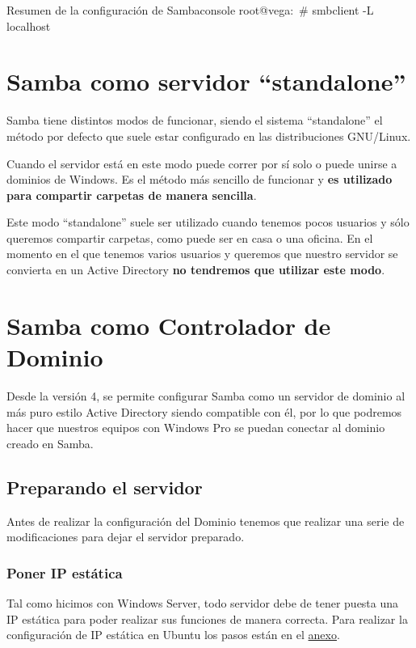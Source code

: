 \begin{mycode}{Resumen de la configuración de Samba}{console}{}
root@vega:~# smbclient -L localhost
\end{mycode}


\section{Samba como servidor “standalone”}
Samba tiene distintos modos de funcionar, siendo el sistema “standalone” el método por defecto que suele estar configurado en las distribuciones GNU/Linux.

Cuando el servidor está en este modo puede correr por sí solo o puede unirse a dominios de Windows. Es el método más sencillo de funcionar y \textbf{es utilizado para compartir carpetas de manera sencilla}.

Este modo “standalone” suele ser utilizado cuando tenemos pocos usuarios y sólo queremos compartir carpetas, como puede ser en casa o una oficina. En el momento en el que tenemos varios usuarios y queremos que nuestro servidor se convierta en un Active Directory \textbf{no tendremos que utilizar este modo}.


\section{Samba como Controlador de Dominio}
Desde la versión 4, se permite configurar Samba como un servidor de dominio al más puro estilo Active Directory siendo compatible con él, por lo que podremos hacer que nuestros equipos con Windows Pro se puedan conectar al dominio creado en Samba.

\subsection{Preparando el servidor}
Antes de realizar la configuración del Dominio tenemos que realizar una serie de modificaciones para dejar el servidor preparado.

\subsubsection{Poner IP estática}
Tal como hicimos con Windows Server, todo servidor debe de tener puesta una IP estática para poder realizar sus funciones de manera correcta. Para realizar la configuración de IP estática en Ubuntu los pasos están en el \hyperlink{configurar_ip_estatica_ubuntu}{anexo}.


